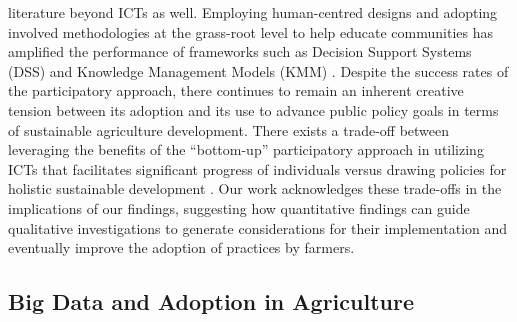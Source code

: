 \documentclass[manuscript,screen]{acmart}
\begin{document}
literature beyond ICTs as well. Employing human-centred designs and adopting involved methodologies at the grass-root level to help educate communities has amplified the performance of frameworks such as Decision Support Systems (DSS) and Knowledge Management Models (KMM) \cite{knoche2010missing, vangala2015icts, lynch2004user}. Despite the success rates of the participatory approach, there continues to remain an inherent creative tension between its adoption and its use to advance public policy goals in terms of sustainable agriculture development. There exists a trade-off between leveraging the benefits of the “bottom-up” participatory approach in utilizing ICTs that facilitates significant progress of individuals versus drawing policies for holistic sustainable development \cite{bruges2008participatory}. Our work acknowledges these trade-offs in the implications of our findings, suggesting how quantitative findings can guide qualitative investigations to generate considerations for their implementation and eventually improve the adoption of practices by farmers.

\subsection{Big Data and Adoption in Agriculture}
\end{document}
